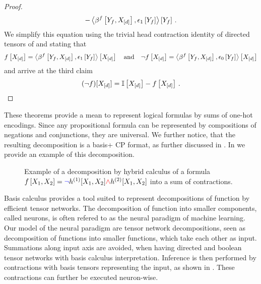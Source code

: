 \begin{proof}
\begin{align*}
        - \left\langle \beta^{f}\left[Y_{f},X_{[d]}\right],\epsilon_1\left[Y_{f}\right]\right\rangle \left[ Y_{f} \right] \, .
    \end{align*}
    We simplify this equation using the trivial head contraction identity of directed tensors of  and  stating that
    \begin{align*}
        f\left[X_{[d]}\right] = \left\langle \beta^{f}\left[Y_{f},X_{[d]}\right],\epsilon_1\left[Y_{f}\right]\right\rangle \left[ X_{[d]} \right]
        \quad \text{and} \quad
        \lnot f\left[X_{[d]}\right] = \left\langle \beta^{f}\left[Y_{f},X_{[d]}\right],\epsilon_0\left[Y_{f}\right]\right\rangle \left[ X_{[d]} \right]
    \end{align*}
    and arrive at the third claim
    \begin{align*}
    (\lnot f)[X_{[d]}]
        = \mathbb{I}\left[X_{[d]}\right] - f\left[X_{[d]}\right]  \, .
    \end{align*}
\end{proof}

These theorems provide a mean to represent logical formulas by sums of one-hot encodings.
Since any propositional formula can be represented by compositions of negations and conjunctions, they are universal.
We further notice, that the resulting decomposition is a basis+ CP format, as further discussed in .
In  we provide an example of this decomposition.


\begin{figure}
    \begin{center}
        
    \end{center}
    \caption{
        Example of a decomposition by hybrid calculus of a formula
        $f\left[X_{1},X_{2}\right] = \textcolor{blue}{\lnot} h^{(1)}[X_{1},X_{2}] \textcolor{red}{\land}  h^{(2)}[X_{1},X_{2}]$ into a sum of contractions.
    }\label{fig:DecompositionExample}
\end{figure}



Basis calculus provides a tool suited to represent decompositions of function by efficient tensor networks.
The decomposition of function into smaller components, called neurons, is often refered to as the neural paradigm of machine learning.
Our model of the neural paradigm are tensor network decompositions, seen as decomposition of functions into smaller functions, which take each other as input.
Summations along input axis are avoided, when having directed and boolean tensor networks with basis calculus interpretation.
Inference is then performed by contractions with basis tensors representing the input, as shown in .
These contractions can further be executed neuron-wise.

